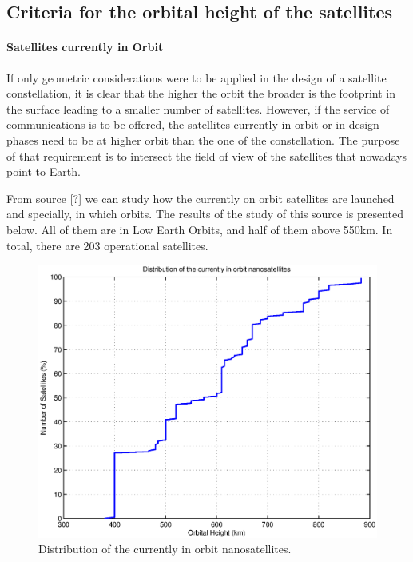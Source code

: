 \subsection{Criteria for the orbital height of the satellites}
\paragraph{Satellites currently in Orbit\\}
If only geometric considerations were to be applied in the design of a satellite constellation, it is clear that the higher the orbit the broader is the footprint in the surface leading to a smaller number of satellites. However, if the service of communications is to be offered, the satellites currently in orbit or in design phases need to be at higher orbit than the one of the constellation. The purpose of that requirement is to intersect the field of view of the satellites that nowadays point to Earth.

From source [?] we can study how the currently on orbit satellites are launched and specially, in which orbits. The results of the study of this source is presented below. All of them are in Low Earth Orbits, and half of them above 550km. In total, there are 203 operational satellites.

\begin{figure}[H]
	\includegraphics[scale=0.8]{CurrentOrbitDistribution}
	\caption{Distribution of the currently in orbit nanosatellites.}	
\end{figure}

